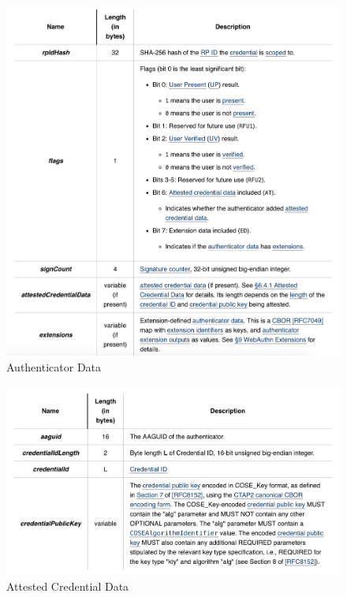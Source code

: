 \documentclass[a4paper, 11pt]{scrartcl}
\begin{document}
\begin{figure}[ht]
  \includegraphics[width=16cm]{img/authenticatorResponseData.png}
  \centering
  \caption{Authenticator Data}
  \label{fig:authenticatorData}
\end{figure}

\begin{figure}[ht]
  \includegraphics[width=16cm]{img/authenticatorData.png}
  \centering
  \caption{Attested Credential Data}
  \label{fig:credentialData}
\end{figure}


\clearpage
\end{document}
